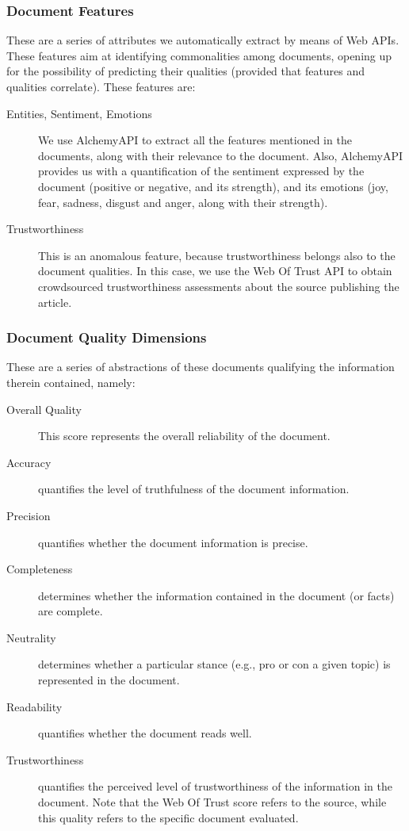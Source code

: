 \documentclass{llncs}
\begin{document}
\subsubsection{Document Features} These are a series of attributes we automatically extract by means of Web APIs. These features aim at identifying commonalities among documents, opening up for the possibility of predicting their qualities (provided that features and qualities correlate). These features are:
\begin{description}
\item[Entities, Sentiment, Emotions] We use AlchemyAPI to extract all the features mentioned in the documents, along with their relevance to the document. Also, AlchemyAPI provides us with a quantification of the sentiment expressed by the document (positive or negative, and its strength), and its emotions (joy, fear, sadness, disgust and anger, along with their strength).
\item[Trustworthiness] This is an anomalous feature, because trustworthiness belongs also to the document qualities. In this case, we use the Web Of Trust API to obtain crowdsourced trustworthiness assessments about the source publishing the article.
\end{description}
\subsubsection{Document Quality Dimensions} These are a series of abstractions of these documents qualifying the information therein contained, namely:
\begin{description}
\item[Overall Quality] This score represents the overall reliability of the document.
\item[Accuracy] quantifies the level of truthfulness of the document information.
\item[Precision] quantifies whether the document information is precise.
\item[Completeness] determines whether the information contained in the document (or facts) are complete.
\item[Neutrality] determines whether a particular stance (e.g., pro or con a given topic) is represented in the document.
\item[Readability] quantifies whether the document reads well.
\item[Trustworthiness] quantifies the perceived level of trustworthiness of the information in the document. Note that the Web Of Trust score refers to the source, while this quality refers to the specific document evaluated.
\end{description}
\end{document}
